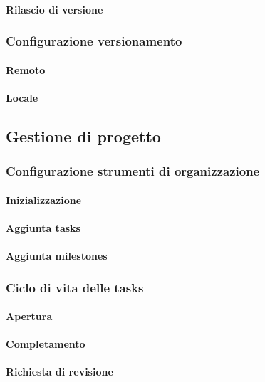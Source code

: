 \paragraph{Rilascio di versione}

\subsubsection{Configurazione versionamento}

\paragraph{Remoto}
\paragraph{Locale}
		
\subsection{Gestione di progetto}

\subsubsection{Configurazione strumenti di organizzazione}
	\paragraph{Inizializzazione}
	\paragraph{Aggiunta tasks}
	\paragraph{Aggiunta milestones}

\subsubsection{Ciclo di vita delle tasks}
	\paragraph{Apertura}
	\paragraph{Completamento}
	\paragraph{Richiesta di revisione}
